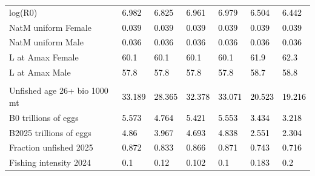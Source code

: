 \documentclass[
]{scrartcl}
\begin{document}
\begin{landscape}
\begin{longtable}[t]{ll>{\raggedright\arraybackslash}p{5em}>{\raggedright\arraybackslash}p{5em}>{\raggedright\arraybackslash}p{5em}>{\raggedright\arraybackslash}p{5em}>{\raggedright\arraybackslash}p{5em}}
\hspace{1em}log(R0) & \textcolor{black}{6.982} & \textcolor{black}{6.825} & \textcolor{black}{6.961} & \textcolor{black}{6.979} & \textcolor{black}{6.504} & \textcolor{black}{6.442}\\
\hspace{1em}NatM uniform Female & \textcolor{black}{0.039} & \textcolor{black}{0.039} & \textcolor{black}{0.039} & \textcolor{black}{0.039} & \textcolor{black}{0.039} & \textcolor{black}{0.039}\\
\hspace{1em}NatM uniform Male & \textcolor{black}{0.036} & \textcolor{black}{0.036} & \textcolor{black}{0.036} & \textcolor{black}{0.036} & \textcolor{black}{0.036} & \textcolor{black}{0.036}\\
\hspace{1em}L at Amax Female & \textcolor{black}{60.1} & \textcolor{black}{60.1} & \textcolor{black}{60.1} & \textcolor{black}{60.1} & \textcolor{black}{61.9} & \textcolor{black}{62.3}\\
\hspace{1em}L at Amax Male & \textcolor{black}{57.8} & \textcolor{black}{57.8} & \textcolor{black}{57.8} & \textcolor{black}{57.8} & \textcolor{black}{58.7} & \textcolor{black}{58.8}\\
\addlinespace[0.3em]
\multicolumn{7}{l}{\textbf{Estimates of derived quantities}}\\
\hspace{1em}Unfished age 26+ bio 1000 mt & \textcolor{black}{33.189} & \textcolor{black}{28.365} & \textcolor{black}{32.378} & \textcolor{black}{33.071} & \textcolor{black}{20.523} & \textcolor{black}{19.216}\\
\hspace{1em}B0 trillions of eggs & \textcolor{black}{5.573} & \textcolor{black}{4.764} & \textcolor{black}{5.421} & \textcolor{black}{5.553} & \textcolor{black}{3.434} & \textcolor{black}{3.218}\\
\hspace{1em}B2025 trillions of eggs & \textcolor{black}{4.86} & \textcolor{black}{3.967} & \textcolor{black}{4.693} & \textcolor{black}{4.838} & \textcolor{black}{2.551} & \textcolor{black}{2.304}\\
\hspace{1em}Fraction unfished 2025 & \textcolor{black}{0.872} & \textcolor{black}{0.833} & \textcolor{black}{0.866} & \textcolor{black}{0.871} & \textcolor{black}{0.743} & \textcolor{black}{0.716}\\
\hspace{1em}Fishing intensity 2024 & \textcolor{black}{0.1} & \textcolor{black}{0.12} & \textcolor{black}{0.102} & \textcolor{black}{0.1} & \textcolor{black}{0.183} & \textcolor{black}{0.2}\\

\end{longtable}
\end{landscape}
\end{document}
